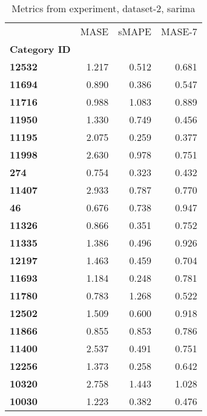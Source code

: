 \begin{table}[h]
\centering
\caption{Metrics from experiment, dataset-2, sarima}
\label{table:sarima-dataset-2}
\begin{tabular}{lrrr}
\toprule
{} &   MASE &  sMAPE &  MASE-7 \\
\textbf{Category ID} &        &        &         \\
\midrule
\textbf{12532      } &  1.217 &  0.512 &   0.681 \\
\textbf{11694      } &  0.890 &  0.386 &   0.547 \\
\textbf{11716      } &  0.988 &  1.083 &   0.889 \\
\textbf{11950      } &  1.330 &  0.749 &   0.456 \\
\textbf{11195      } &  2.075 &  0.259 &   0.377 \\
\textbf{11998      } &  2.630 &  0.978 &   0.751 \\
\textbf{274        } &  0.754 &  0.323 &   0.432 \\
\textbf{11407      } &  2.933 &  0.787 &   0.770 \\
\textbf{46         } &  0.676 &  0.738 &   0.947 \\
\textbf{11326      } &  0.866 &  0.351 &   0.752 \\
\textbf{11335      } &  1.386 &  0.496 &   0.926 \\
\textbf{12197      } &  1.463 &  0.459 &   0.704 \\
\textbf{11693      } &  1.184 &  0.248 &   0.781 \\
\textbf{11780      } &  0.783 &  1.268 &   0.522 \\
\textbf{12502      } &  1.509 &  0.600 &   0.918 \\
\textbf{11866      } &  0.855 &  0.853 &   0.786 \\
\textbf{11400      } &  2.537 &  0.491 &   0.751 \\
\textbf{12256      } &  1.373 &  0.258 &   0.642 \\
\textbf{10320      } &  2.758 &  1.443 &   1.028 \\
\textbf{10030      } &  1.223 &  0.382 &   0.476 \\
\bottomrule
\end{tabular}
\end{table}
